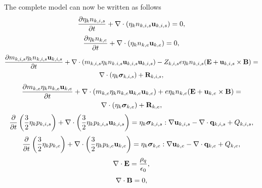 \documentclass[a4paper,11pt]{report}
\begin{document}
The complete model can now be written as follows
\begin{equation}
    \label{eq:mf_mm_ni}
    \frac{\partial \eta_k n_{k,i,s}}{\partial t} + \nabla \cdot \left ( \eta_k n_{k,i,s} \mathbf{u}_{k,i,s} \right ) = 0,
\end{equation}
\begin{equation}
    \label{eq:mf_mm_ne}
    \frac{\partial \eta_k n_{k,e}}{\partial t} + \nabla \cdot \left ( \eta_k n_{k,e} \mathbf{u}_{k,e} \right ) = 0,
\end{equation}
\begin{multline}
    \label{eq:mf_mm_ui}
    \frac{\partial m_{k,i,s} \eta_k n_{k,i,s} \mathbf{u}_{k,i,s}}{\partial t} + \nabla \cdot \left( m_{k,i,s} \eta_k n_{k.i,s} \mathbf{u}_{k,i,s} \mathbf{u}_{k,i,s} \right) 
    - Z_{k,i,s} e \eta_k n_{k,i,s} ( \mathbf{E} + \mathbf{u}_{k,i,s} \times \mathbf{B} ) = \\
     \nabla \cdot \left( \eta_k \bm \sigma_{k,i,s} \right) + \mathbf{R}_{k,i,s},
\end{multline}
\begin{multline}
    \label{eq:mf_mm_ue}
    \frac{\partial m_{k,e} \eta_k n_{k,e} \mathbf{u}_{k,e}}{\partial t} + \nabla \cdot \left( m_{k,e} \eta_k n_{k,e} \mathbf{u}_{k,e} \mathbf{u}_{k,e} \right) + e \eta_k n_{k,e} ( \mathbf{E} + \mathbf{u}_{k,e} \times \mathbf{B} ) = \\
    \nabla \cdot \left( \eta_k \bm \sigma_{k,e} \right) + \mathbf{R}_{k,e},
\end{multline}
\begin{equation}
    \label{eq:mf_mm_iei}
    \frac{\partial}{\partial t} \left ( \frac{3}{2} \eta_k p_{k,i,s} \right ) + \nabla \cdot \left ( \frac{3}{2} \eta_k p_{k,i,s} \mathbf{u}_{k,i,s} \right ) = \eta_k \bm \sigma_{k,i,s} : \nabla \mathbf{u}_{k,i,s} - \nabla \cdot \mathbf{q}_{k,i,s} + Q_{k,i,s},
\end{equation}
\begin{equation}
    \label{eq:mf_mm_iee}
    \frac{\partial}{\partial t} \left ( \frac{3}{2} \eta_k p_{k,e} \right ) + \nabla \cdot \left ( \frac{3}{2} \eta_k p_{k,e} \mathbf{u}_{k,e} \right ) = \eta_k \bm \sigma_{k,e} : \nabla \mathbf{u}_{k,e} - \nabla \cdot \mathbf{q}_{k,e} + Q_{k,e},
\end{equation}
\begin{equation}
    \label{eq:mf_mm_maxwell_3}
    \nabla \cdot \mathbf{E} = \frac{\rho_q}{\epsilon_0},
\end{equation}
\begin{equation}
    \label{eq:mf_mm_maxwell_4}
    \nabla \cdot \mathbf{B} = 0,
\end{equation}
\end{document}

